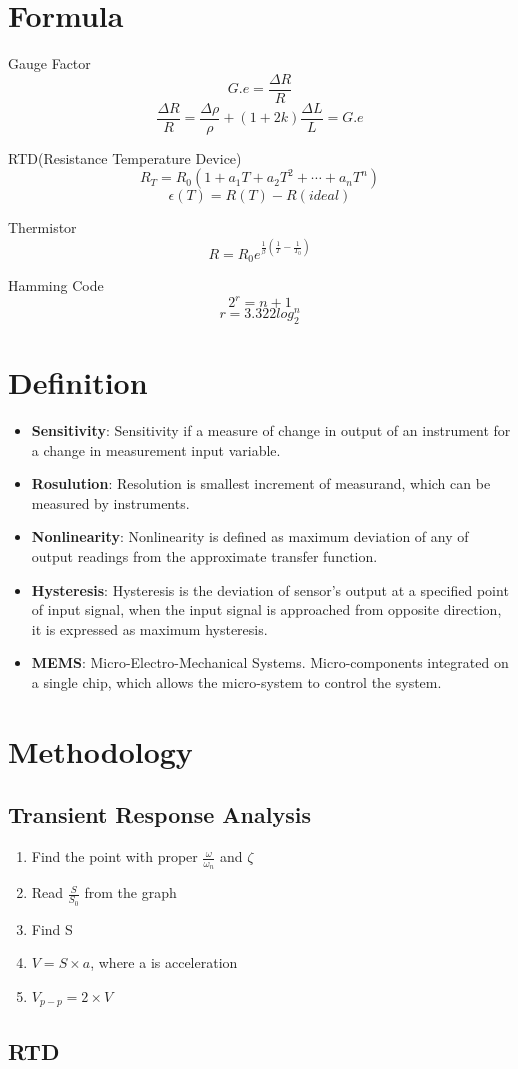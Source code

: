\documentclass{article}
\begin{document}
  \section{Formula}
Gauge Factor $$ G.e = \frac{\Delta R}{R} $$
$$\frac{\Delta R}{R} = \frac{\Delta \rho}{\rho} + (1+2k)\frac{\Delta L}{L} = G.e$$

RTD(Resistance Temperature Device) 
$$R_T = R_0(1+a_1T + a_2T^2 + \cdots + a_nT^n)$$
$$\epsilon(T) = R(T) - R(ideal)$$


Thermistor
$$R = R_0e^{\frac{1}{\beta}(\frac{1}{T} - \frac{1}{T_0})}$$

Hamming Code
$$2^r = n+1$$
$$ r = 3.322log_2^n$$
   \section{Definition}
   \begin{itemize}
    \item \textbf{Sensitivity}: Sensitivity if a measure of change in output of an instrument for a change in measurement input variable.
    \item \textbf{Rosulution}: Resolution is smallest increment of measurand, which can be measured by instruments.
    
    \item \textbf{Nonlinearity}: Nonlinearity is defined as maximum deviation of any of output readings from the approximate transfer function.
    
    \item \textbf{Hysteresis}: Hysteresis is the deviation of sensor's output at a specified point of input signal, when the input signal is approached from opposite direction, it is expressed as maximum hysteresis.
    
    \item \textbf{MEMS}: Micro-Electro-Mechanical Systems. Micro-components integrated on a single chip, which allows the micro-system to control the system.
   \end{itemize}
\section{Methodology}
  \subsection{Transient Response Analysis}
  \begin{enumerate}
   \item Find the point with proper $\frac{\omega}{\omega_n}$ and $\zeta$
   \item Read $\frac{S}{S_0}$ from the graph
   \item Find S
   \item $V = S \times a$, where a is acceleration
   \item $V_{p-p} = 2\times V$
  \end{enumerate}
  
  \subsection{RTD}
  \begin{enumerate}
  
  \end{enumerate}
\end{document}
